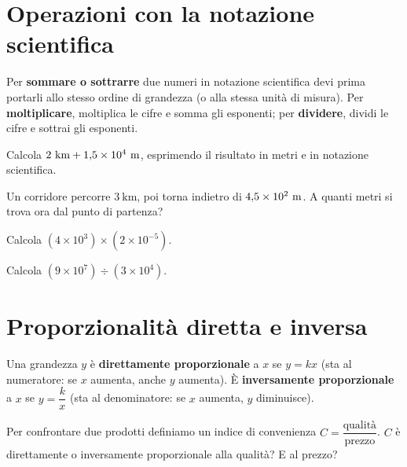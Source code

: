 \documentclass[11pt]{report}
\begin{document}
\section{Operazioni con la notazione scientifica}

\begin{mdframed}
Per \textbf{sommare o sottrarre} due numeri in notazione scientifica devi prima portarli allo stesso ordine di grandezza (o alla stessa unità di misura). Per \textbf{moltiplicare}, moltiplica le cifre e somma gli esponenti; per \textbf{dividere}, dividi le cifre e sottrai gli esponenti.
\end{mdframed}

\begin{exercise}[\onestar]
Calcola $2\ \text{km} + 1{,}5\times10^{4}\ \text m$, esprimendo il risultato in metri e in notazione scientifica.
\end{exercise}

\begin{exercise}[\onestar]
Un corridore percorre $3\ \text{km}$, poi torna indietro di $4{,}5\times10^{2}\ \text m$. A quanti metri si trova ora dal punto di partenza?
\end{exercise}

\begin{exercise}[\onestar]
Calcola $(4\times10^{3})\times(2\times10^{-5})$.
\end{exercise}

\begin{exercise}[\onestar]
Calcola $(9\times10^{7})\div(3\times10^{4})$.
\end{exercise}

\section{Proporzionalità diretta e inversa}

\begin{mdframed}
Una grandezza $y$ è \textbf{direttamente proporzionale} a $x$ se $y=kx$ (sta al numeratore: se $x$ aumenta, anche $y$ aumenta). È \textbf{inversamente proporzionale} a $x$ se $y=\dfrac kx$ (sta al denominatore: se $x$ aumenta, $y$ diminuisce).
\end{mdframed}

\begin{exercise}[\onestar]
Per confrontare due prodotti definiamo un indice di convenienza $C=\dfrac{\text{qualità}}{\text{prezzo}}$. $C$ è direttamente o inversamente proporzionale alla qualità? E al prezzo?
\end{exercise}
\end{document}
